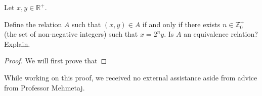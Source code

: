 \documentclass[12pt]{article}
\newenvironment{problem}[2][Problem]{\begin{trivlist}
\item[\hskip \labelsep {\bfseries #1}\hskip \labelsep {\bfseries #2.}]}{\end{trivlist}}
\begin{document}
\newpage
\begin{problem}{8}
    Let \( x, y \in \mathbb{R}^+ \).

\noindent Define the relation \( A \) such that \( (x, y) \in A \) if and only if there exists \( n \in \mathbb{Z}^+_0 \) (the set of non-negative integers) such that \( x = 2^n y \). Is \( A \) an equivalence relation? Explain.
\end{problem}

\begin{proof}
    We will first prove that
    
    \end{proof}

\noindent While working on this proof, we received no external assistance aside from advice from Professor Mehmetaj.
\end{document}

